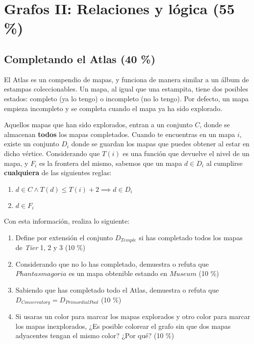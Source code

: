 \documentclass{article}
\begin{document}
\section{Grafos II: Relaciones y lógica (55 \%)}

\subsection{Completando el Atlas (40 \%)}

El Atlas es un compendio de mapas, y funciona de manera similar a un álbum de estampas coleccionables.
Un mapa, al igual que una estampita, tiene dos posibles estados: completo (ya lo tengo) o incompleto (no lo tengo).
Por defecto, un mapa empieza incompleto y se completa cuando el mapa ya ha sido explorado.

Aquellos mapas que han sido explorados, entran a un conjunto $C$, donde se almacenan \textbf{todos} los mapas completados.
Cuando te encuentras en un mapa $i$, existe un conjunto $D_i$ donde se guardan los mapas que puedes obtener al estar en dicho vértice.
Considerando que $T(i)$ es una función que devuelve el nivel de un mapa, y $F_i$ es la frontera del mismo, sabemos que un mapa $d \in D_i$ al cumplirse \textbf{cualquiera} de las siguientes reglas:

\begin{enumerate}
    \item $d \in C \wedge T(d) \leq T(i) + 2 \implies d \in D_i$
    \item $d \in F_i$
\end{enumerate}

Con esta información, realiza lo siguiente:

\begin{enumerate}[label=\tt \alph*)]
    \item Define por extensión el conjunto $D_{Temple}$ si has completado todos los mapas de \textit{Tier} 1, 2 y 3 (10 \%)
    \item Considerando que no lo has completado, demuestra o refuta que $Phantasmagoria$ es un mapa obtenible estando en $Museum$ (10 \%)
    \item Sabiendo que has completado todo el Atlas, demuestra o refuta que $D_{Conservatory} = D_{PrimordialPool}$ (10 \%)
    \item Si usaras un color para marcar los mapas explorados y otro color para marcar los mapas inexplorados, ¿Es posible colorear el grafo sin que dos mapas adyacentes tengan el mismo color? ¿Por qué? (10 \%)
\end{enumerate}
\end{document}

